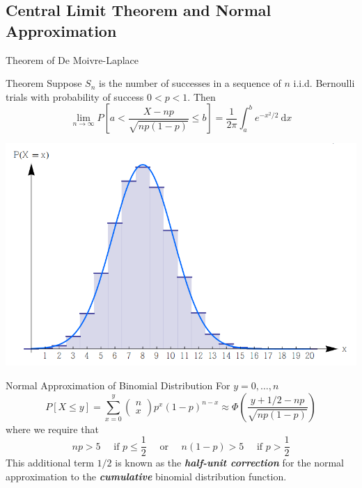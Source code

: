 \documentclass{beamer}
\newcommand{\bb}[1]{\textcolor{antiquefuchsia}{\textbf{\textit{#1}}}}
\begin{document}
\subsection{Central Limit Theorem and Normal Approximation}
\begin{frame}{Theorem of De Moivre-Laplace}
\begin{block}{Theorem}
Suppose $S_{n}$ is the number of successes in a sequence of $n$ i.i.d. Bernoulli trials with probability of success $0<p<1$. Then
$$
\lim _{n \rightarrow \infty} P\left[a<\frac{X-n p}{\sqrt{n p(1-p)}} \leq b\right]=\frac{1}{2 \pi} \int_{a}^{b} e^{-x^{2} / 2} \mathrm{~d} x
$$
\end{block}
\begin{center}
\includegraphics[scale=0.3]{appro.png}
\end{center}
\end{frame}


\begin{frame}{Normal Approximation of Binomial Distribution}
For $y=0, \ldots, n$
$$
P[X \leq y]=\sum_{x=0}^{y}\left(\begin{array}{l}
n \\
x
\end{array}\right) p^{x}(1-p)^{n-x} \approx \Phi\left(\frac{y+1 / 2-n p}{\sqrt{n p(1-p)}}\right)
$$
where we require that
$$
n p>5 \quad \text { if } p \leq \frac{1}{2} \quad \text { or } \quad n(1-p)>5 \quad \text { if } p>\frac{1}{2}
$$
This additional term $1 / 2$ is known as the \bb{half-unit correction} for the normal approximation to the \bb{cumulative} binomial distribution function.
\end{frame}
\end{document}
